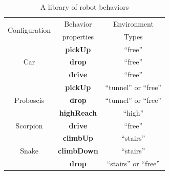 \documentclass[12pt]{article}
\makeatletter
\newcommand{\leqnomode}{\tagsleft@true}
\makeatother
\begin{document}


\begin{table}[H]
\centering
\begin{tabular}{ |c|c|c| } 
 \hline
 \multirow{2}{6em}{Configuration} & Behavior & Environment \\
 & properties & Types \\
 \hline
 \multirow{3}{*}{Car} & \textbf{pickUp} & ``free'' \\\cline{2-3}
  & \textbf{drop} & ``free'' \\\cline{2-3}
  & \textbf{drive} & ``free''\\ \hline
 \multirow{3}{*}{Proboscis} & \textbf{pickUp} & ``tunnel'' or ``free''\\ \cline{2-3}
  & \textbf{drop} &``tunnel'' or ``free'' \\ \cline{2-3}
  & \textbf{highReach} & ``high''\\ \hline
 Scorpion & \textbf{drive} & ``free''\\ \hline
 \multirow{3}{*}{Snake} & \textbf{climbUp} & ``stairs''\\ \cline{2-3}
  & \textbf{climbDown} & ``stairs''\\ \cline{2-3}
  & \textbf{drop} & ``stairs'' or ``free''\\
 \hline
\end{tabular}
\caption{A library of robot behaviors}
\label{table:1}
\end{table}
\end{document}
